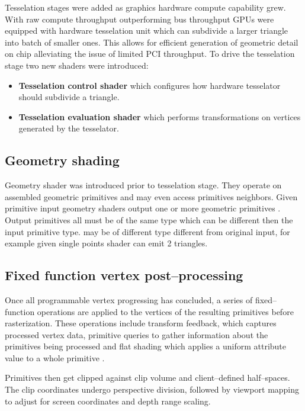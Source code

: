 Tesselation stages were added as graphics hardware compute capability grew. With raw compute throughput outperforming bus throughput GPUs were equipped with hardware
tesselation unit which can subdivide a larger triangle into batch of smaller ones. This allows for efficient generation of geometric detail on chip alleviating the 
issue of limited PCI throughput.
To drive the tesselation stage two new shaders were introduced:
\begin{itemize}
    \item \textbf{Tesselation control shader} which configures how hardware tesselator should subdivide a triangle.
    \item \textbf{Tesselation evaluation shader} which performs transformations on vertices generated by the tesselator.
\end{itemize}

\subsection{Geometry shading}

Geometry shader was introduced prior to tesselation stage. They operate on assembled geometric primitives and may even access primitives neighbors.
Given primitive input geometry shaders output one or more geometric primitives \cite{openglspec}. 
Output primitives all must be of the same type which can be different then the input primitive type.
may be of different type different from original input, for example given single points shader can emit 2 triangles.

\subsection{Fixed function vertex post--processing}

Once all programmable vertex progressing has concluded, a series of fixed--function operations are applied to the vertices of the resulting primitives before rasterization.
These operations include transform feedback, which captures processed vertex data, 
primitive queries to gather information about the primitives being processed 
and flat shading which applies a uniform attribute value to a whole primitive \cite{openglspec}.

Primitives then get clipped against clip volume and client--defined half--spaces.
The clip coordinates undergo perspective division, followed by viewport mapping to adjust for screen coordinates and depth range scaling.

